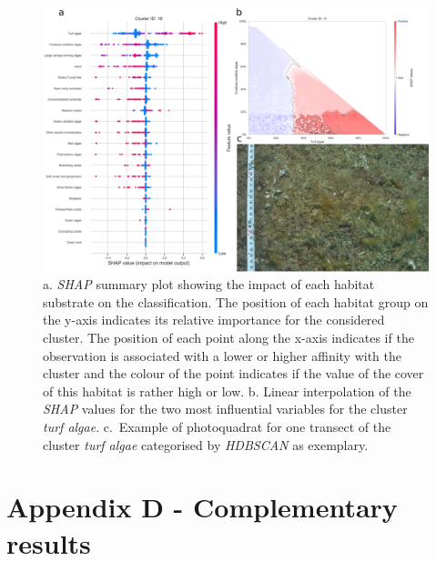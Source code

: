 \begin{figure}
\hypertarget{fig:chap2figS36}{%
\centering
\includegraphics{03-Chapitre2/figures/supplementary/05-explanation_shap_pq_cluster_16.png}
\caption{a. \emph{SHAP} summary plot showing the impact of each habitat
substrate on the classification. The position of each habitat group on
the y-axis indicates its relative importance for the considered cluster.
The position of each point along the x-axis indicates if the observation
is associated with a lower or higher affinity with the cluster and the
colour of the point indicates if the value of the cover of this habitat
is rather high or low. b. Linear interpolation of the \emph{SHAP} values
for the two most influential variables for the cluster \emph{turf
algae}. c.~Example of photoquadrat for one transect of the cluster
\emph{turf algae} categorised by \emph{HDBSCAN} as
exemplary.}\label{fig:chap2figS36}
}
\end{figure}

\clearpage

\hypertarget{appendixD-chapter2}{%
\section*{Appendix D - Complementary results}\label{appendixD-chapter2}}

